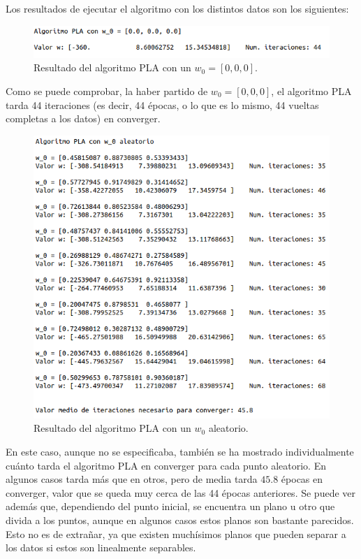 \documentclass[11pt,a4paper]{article}
\begin{document}
Los resultados de ejecutar el algoritmo con los distintos datos son los siguientes:

\begin{figure}[H]
\centering
\includegraphics[scale=0.6]{img/pla_0_normal.png}
\caption{Resultado del algoritmo PLA con un $w_0 = [0, 0, 0]$.}
\end{figure}

Como se puede comprobar, la haber partido de $w_0 = [0, 0, 0]$, el algoritmo PLA tarda 44 iteraciones
(es decir, 44 épocas, o lo que es lo mismo, 44 vueltas completas a los datos) en converger.

\begin{figure}[H]
\centering
\includegraphics[scale=0.6]{img/pla_rand_normal.png}
\caption{Resultado del algoritmo PLA con un $w_0$ aleatorio.}
\end{figure}

En este caso, aunque no se especificaba, también se ha mostrado individualmente cuánto tarda el
algoritmo PLA en converger para cada punto aleatorio. En algunos casos tarda más que en otros, pero
de media tarda $45.8$ épocas en converger, valor que se queda muy cerca de las 44 épocas anteriores.
Se puede ver además que, dependiendo del punto inicial, se encuentra un plano u otro que divida a los
puntos, aunque en algunos casos estos planos son bastante parecidos. Esto no es de extrañar, ya que
existen muchísimos planos que pueden separar a los datos si estos son linealmente separables.
\end{document}
